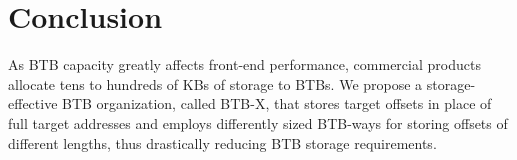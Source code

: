 \section{Conclusion}
\label{pact:sec:concl}

As BTB capacity greatly affects front-end performance, commercial products allocate tens to hundreds of KBs of storage to BTBs. We propose a storage-effective BTB organization, called BTB-X, that stores target offsets in place of full target addresses and employs differently sized BTB-ways for storing offsets of different lengths, thus drastically reducing BTB storage requirements.